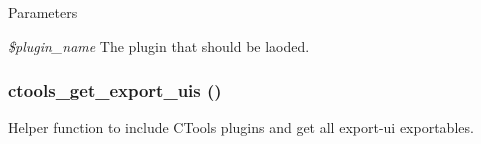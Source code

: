 \begin{DoxyParams}{Parameters}
\item[{\em \$plugin\_\-name}]The plugin that should be laoded. \end{DoxyParams}
\hypertarget{export-ui_8inc_a8212c89203edba98701c590094409cef}{
\subsubsection[{ctools\_\-get\_\-export\_\-uis}]{\setlength{\rightskip}{0pt plus 5cm}ctools\_\-get\_\-export\_\-uis ()}}
\label{export-ui_8inc_a8212c89203edba98701c590094409cef}
Helper function to include CTools plugins and get all export-\/ui exportables. 